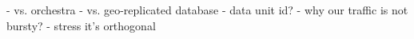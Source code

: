 - vs. orchestra
- vs. geo-replicated database
- data unit id?
- why our traffic is not bursty?
- stress it's orthogonal
